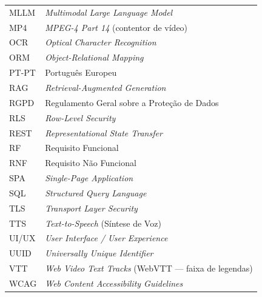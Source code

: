 \begin{longtable}{@{}p{2.6cm}p{12cm}@{}}
MLLM   & \textit{Multimodal Large Language Model} \\
MP4    & \textit{MPEG-4 Part 14} (contentor de vídeo) \\
OCR    & \textit{Optical Character Recognition} \\
ORM    & \textit{Object-Relational Mapping} \\
PT-PT  & Português Europeu \\
RAG    & \textit{Retrieval-Augmented Generation} \\
RGPD   & Regulamento Geral sobre a Proteção de Dados \\
RLS    & \textit{Row-Level Security} \\
REST   & \textit{Representational State Transfer} \\
RF     & Requisito Funcional \\
RNF    & Requisito Não Funcional \\
SPA    & \textit{Single-Page Application} \\
SQL    & \textit{Structured Query Language} \\
TLS    & \textit{Transport Layer Security} \\
TTS    & \textit{Text-to-Speech} (Síntese de Voz) \\
UI/UX  & \textit{User Interface / User Experience} \\
UUID   & \textit{Universally Unique Identifier} \\
VTT    & \textit{Web Video Text Tracks} (WebVTT --- faixa de legendas) \\
WCAG   & \textit{Web Content Accessibility Guidelines} \\
\end{longtable}

